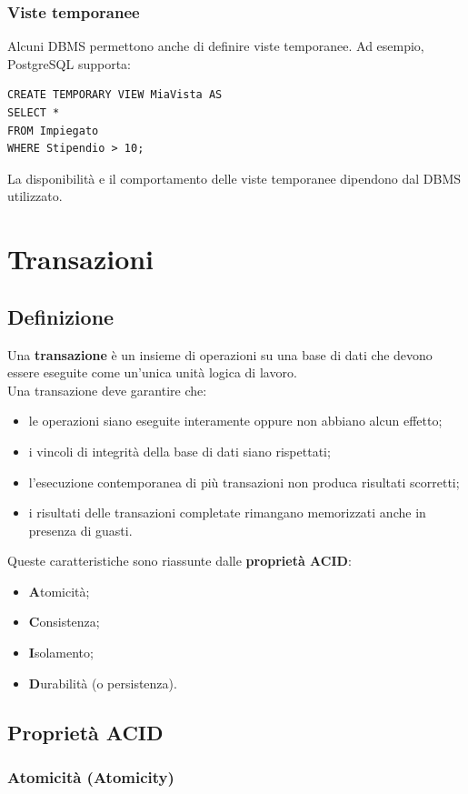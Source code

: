 \subsubsection*{Viste temporanee}
Alcuni DBMS permettono anche di definire
viste temporanee.
Ad esempio, PostgreSQL supporta:
\begin{verbatim}
CREATE TEMPORARY VIEW MiaVista AS
SELECT *
FROM Impiegato
WHERE Stipendio > 10;
\end{verbatim}
La disponibilità e il comportamento delle
viste temporanee dipendono dal DBMS utilizzato.

\section{Transazioni}
\subsection{Definizione}
Una \textbf{transazione} è un insieme di operazioni su una
base di dati che devono essere eseguite come un'unica
unità logica di lavoro.\\
Una transazione deve garantire che:
\begin{itemize}
    \item le operazioni siano eseguite interamente oppure
    non abbiano alcun effetto;
    \item i vincoli di integrità della base di dati siano
    rispettati;
    \item l'esecuzione contemporanea di più transazioni
    non produca risultati scorretti;
    \item i risultati delle transazioni completate
    rimangano memorizzati anche in presenza di guasti.
\end{itemize}
\noindent Queste caratteristiche sono riassunte dalle
\textbf{proprietà ACID}:
\begin{itemize}
    \item \textbf{A}tomicità;
    \item \textbf{C}onsistenza;
    \item \textbf{I}solamento;
    \item \textbf{D}urabilità (o persistenza).
\end{itemize}

\subsection{Proprietà ACID}

\subsubsection{Atomicità (Atomicity)}


